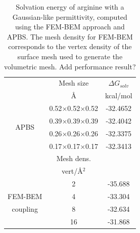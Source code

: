 \begin{table}
\centering
\begin{tabular}{c|c|c}
&Mesh size & $\Delta G_{solv}$\\
&\AA       &  kcal/mol \\
\hline
\multirow{4}{*}{APBS}& 0.52$\times$0.52$\times$0.52 & -32.4652\\ 
& 0.39$\times$0.39$\times$0.39 & -32.4042\\ 
&0.26$\times$0.26$\times$0.26 & -32.3375\\ 
&0.17$\times$0.17$\times$0.17 & -32.3413\\ 
\hline
&Mesh dens. & \\
&vert/\AA$^2$ & \\
\hline
    & 2 & -35.688 \\
FEM-BEM    & 4  & -33.304 \\
coupling    & 8  & -32.634 \\
    & 16 & -31.868 \\
\hline
\end{tabular}
\caption{Solvation energy of arginine with a Gaussian-like permittivity, computed using the FEM-BEM approach and APBS. The mesh density for FEM-BEM corresponds to the vertex density of the surface mesh used to generate the volumetric mesh. Add performance result?}
\label{table:arg_variable}
\end{table}

